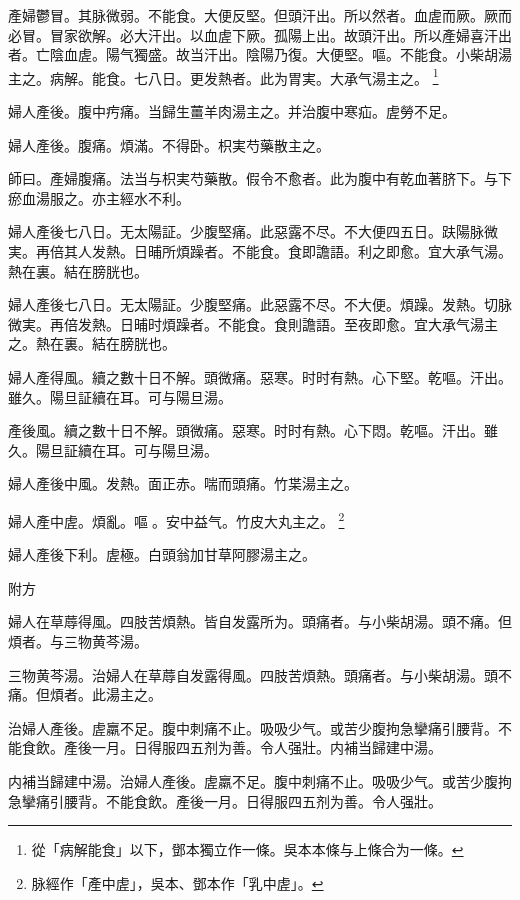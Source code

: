 產婦鬱冒。其脉微弱。不能食。大便反堅。但頭汗出。所以然者。血虗而厥。厥而必冒。冒家欲解。必大汗出。以血虗下厥。孤陽上出。故頭汗出。所以產婦喜汗出者。亡陰血虗。陽气獨盛。故当汗出。陰陽乃復。大便堅。嘔。不能食。小柴胡湯主之。病解。能食。七八日。更发熱者。此为胃実。大承气湯主之。{\dengben}
	\footnote{從「病解能食」以下，鄧本獨立作一條。吳本本條与上條合为一條。}

{\khaaitp 婦人}產後。腹中㽲痛。当歸生薑羊肉湯主之。并治腹中寒疝。虗勞不足。

{\khaaitp 婦人}產後。腹痛。煩滿。不得卧。枳実芍藥散主之。

師曰。產婦腹痛。法当与枳実芍藥散。假令不愈者。此为腹中有乾血著脐下。与下瘀血湯服之。{\khaaitp 亦}主經水不利。

婦人產後七八日。无太陽証。少腹堅痛。此惡露不尽。不大便四五日。趺陽脉微実。再倍其人发熱。日晡所煩躁者。不{\khaaitp 能}食。食即譫語。利之即愈。宜大承气湯。熱在裏。結在膀胱也。{\wuben}

{\khaaitp 婦人}產後七八日。无太陽証。少腹堅痛。此惡露不尽。不大便。煩躁。发熱。切脉微実。再倍发熱。日晡时煩躁者。不{\khaaitp 能}食。食則譫語。至夜即愈。宜大承气湯主之。熱在裏。結在膀胱也。{\dengben}

婦人產得風。續之數十日不解。頭微痛。惡寒。时时有熱。心下堅。乾嘔。汗出。雖久。陽旦証續在耳。可与陽旦湯。{\wuben}

產後風。續之數十日不解。頭微痛。惡寒。时时有熱。心下悶。乾嘔。汗出。雖久。陽旦証續在耳。可与陽旦湯。{\dengben}

{\khaaitp 婦人}產後中風。发熱。面{\khaaitp 正}赤。喘而頭痛。竹枼湯主之。

婦人產中虗。煩亂。嘔{\sungtpii 𠱘}。安中益气。竹皮大丸主之。
	\footnote{脉經作「產中虗」，吳本、鄧本作「乳中虗」。}

{\khaaitp 婦人}產後下利。虗極。白頭翁加甘草阿膠湯主之。

附方

婦人在草蓐得風。四肢苦煩熱。皆自发露所为。頭痛者。与小柴胡湯。頭不痛。但煩者。与三物黄芩湯。{\wuben}

三物黄芩湯。治婦人在草蓐自发露得風。四肢苦煩熱。頭痛者。与小柴胡湯。頭不痛。但煩者。此湯主之。{\dengben}

治婦人產後。虗羸不足。腹中刺痛不止。吸吸少气。或苦少腹拘急攣痛引腰背。不能食飲。產後一月。日得服四五剂为善。令人强壯。内補当歸建中湯。{\wuben}

内補当歸建中湯。治婦人產後。虗羸不足。腹中刺痛不止。吸吸少气。或苦少腹拘急攣痛引腰背。不能食飲。產後一月。日得服四五剂为善。令人强壯。{\dengben}

